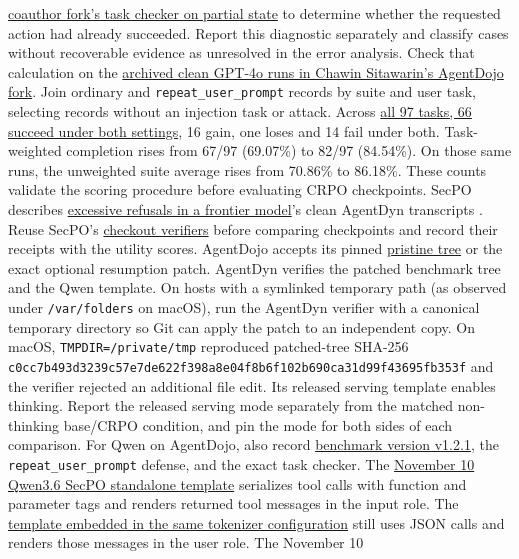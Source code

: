 \documentclass[11pt]{article}
\begin{document}
\begin{itemize}
\href{https://github.com/chawins/agentdojo/blob/07e5ed5d6039571eb7b5bda683143ebd2666e1b7/src/agentdojo/task_suite/task_suite.py#L433-L477}{coauthor fork’s task checker on partial state} to determine whether the requested action had already succeeded. Report this diagnostic separately and classify cases without recoverable evidence as unresolved in the error analysis. Check that calculation on the \href{https://github.com/chawins/agentdojo/tree/1594475cb78cb2c0ce2c8ea8cb75578fce3d9490/runs}{archived clean GPT-4o runs in Chawin Sitawarin's AgentDojo fork}. Join ordinary and \texttt{repeat\_user\_prompt} records by suite and user task, selecting records without an injection task or attack. Across \href{https://github.com/ethz-spylab/agentdojo/tree/d3640b5b03a88eb44dad96852e1de1ef437d836e/runs}{all 97 tasks, 66 succeed under both settings}, 16 gain, one loses and 14 fail under both. Task-weighted completion rises from 67/97 (69.07\%) to 82/97 (84.54\%). On those same runs, the unweighted suite average rises from 70.86\% to 86.18\%. These counts validate the scoring procedure before evaluating CRPO checkpoints. SecPO describes \href{https://arxiv.org/html/2610.41998v1#S7}{excessive refusals in a frontier model}'s clean AgentDyn transcripts \cite[Sec.~7]{chen2026secpo}. Reuse SecPO's \href{https://github.com/Sizhe-Chen/SecPO/blob/da0372a0e598badf4e51c98c175a962147cac2ac/src/secpo/evaluation/agentdojo_qwen36.py}{checkout verifiers} before comparing checkpoints and record their receipts with the utility scores. AgentDojo accepts its pinned \href{https://github.com/Sizhe-Chen/SecPO/blob/da0372a0e598badf4e51c98c175a962147cac2ac/docs/AGENTDOJO.md}{pristine tree} or the exact optional resumption patch. AgentDyn verifies the patched benchmark tree and the Qwen template. On hosts with a symlinked temporary path (as observed under \texttt{/var/folders} on macOS), run the AgentDyn verifier with a canonical temporary directory so Git can apply the patch to an independent copy. On macOS, \texttt{TMPDIR=/private/tmp} reproduced patched-tree SHA-256 \texttt{c0cc7b493d3239c5\allowbreak{}7e7de622f398a8e0\allowbreak{}4f8b6f102b690ca3\allowbreak{}1d99f43695fb353f} and the verifier rejected an additional file edit. Its released serving template enables thinking. Report the released serving mode separately from the matched non-thinking base/CRPO condition, and pin the mode for both sides of each comparison. For Qwen on AgentDojo, also record \href{https://github.com/Sizhe-Chen/SecPO/blob/da0372a0e598badf4e51c98c175a962147cac2ac/configs/evaluate_agentdojo_qwen36_27b.json}{benchmark version v1.2.1}, the \texttt{repeat\_user\_prompt} defense, and the exact task checker. The \href{https://huggingface.co/Sizhe-Chen/Qwen3.6-27B-Instruct-SecPO/blob/4009c2799ed23c4cbb01fd49883c96fe2f2b3dd2/chat_template.jinja}{November 10 Qwen3.6 SecPO standalone template} serializes tool calls with function and parameter tags and renders returned tool messages in the input role. The \href{https://huggingface.co/Sizhe-Chen/Qwen3.6-27B-Instruct-SecPO/blob/4009c2799ed23c4cbb01fd49883c96fe2f2b3dd2/tokenizer_config.json}{template embedded in the same tokenizer configuration} still uses JSON calls and renders those messages in the user role. The November 10 
\end{itemize}
\end{document}
